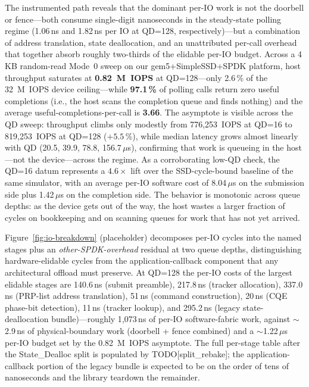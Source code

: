 \documentclass[journal]{IEEEtran}
\begin{document}
The instrumented path reveals that the dominant per-IO work is not the
doorbell or fence---both consume single-digit nanoseconds in the
steady-state polling regime (1.06\,ns and 1.82\,ns per IO at QD=128,
respectively)---but a combination of address translation, state
deallocation, and an unattributed per-call overhead that together absorb
roughly two-thirds of the elidable per-IO budget.
Across a 4\,KB random-read Mode~0 sweep on our gem5+SimpleSSD+SPDK
platform, host throughput saturates at \textbf{0.82~M~IOPS} at
QD=128---only 2.6\,\% of the 32~M~IOPS device ceiling---while
\textbf{97.1\,\%} of polling calls return zero useful completions
(i.e., the host scans the completion queue and finds nothing) and the
average useful-completions-per-call is \textbf{3.66}. The asymptote is
visible across the QD sweep: throughput climbs only modestly from
776,253~IOPS at QD=16 to 819,253~IOPS at QD=128 ($+5.5$\,\%), while
median latency grows almost linearly with QD (20.5, 39.9, 78.8,
156.7\,$\mu$s), confirming that work is queueing in the host---not the
device---across the regime.
As a corroborating low-QD check, the QD=16 datum represents a
$4.6\times$ lift over the SSD-cycle-bound baseline of the same
simulator, with an average per-IO software cost of 8.04\,$\mu$s on the
submission side plus 1.42\,$\mu$s on the completion side.
The behavior is monotonic across queue depths: as the device gets out of
the way, the host wastes a larger fraction of cycles on bookkeeping and on
scanning queues for work that has not yet arrived.

Figure~\ref{fig:io-breakdown} (placeholder) decomposes per-IO cycles into
the named stages plus an \emph{other-SPDK-overhead} residual at two queue
depths, distinguishing hardware-elidable cycles from the
application-callback component that any architectural offload must
preserve. At QD=128 the per-IO costs of the largest elidable stages are
140.6\,ns (submit preamble), 217.8\,ns (tracker allocation), 337.0\,ns
(PRP-list address translation), 51\,ns (command construction),
20\,ns (CQE phase-bit detection), 11\,ns (tracker lookup), and 295.2\,ns
(legacy state-deallocation bundle)---roughly 1{,}073\,ns of per-IO
software-fabric work, against $\sim$2.9\,ns of physical-boundary work
(doorbell + fence combined) and a $\sim$1.22\,$\mu$s per-IO budget set
by the 0.82~M~IOPS asymptote. The full per-stage table after the
State\_Dealloc split is populated by TODO[split\_rebake]; the
application-callback portion of the legacy bundle is expected to be on
the order of tens of nanoseconds and the library teardown the remainder.
\end{document}
